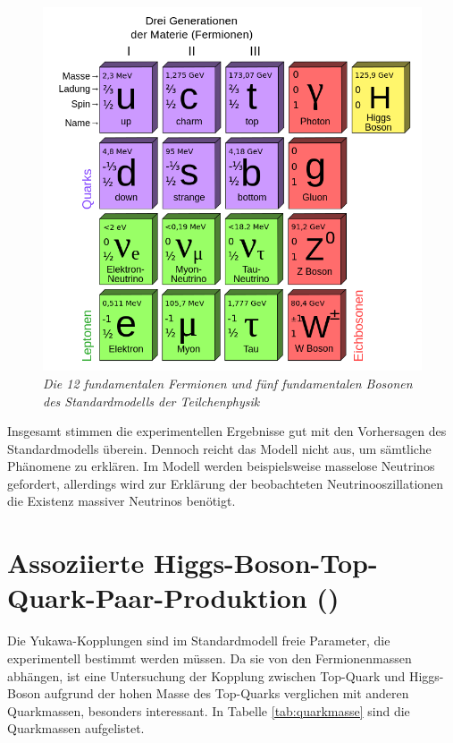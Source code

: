 \begin{figure}[hhh]
 \begin{center}
   \includegraphics[width=\textwidth]{graphics/Standard_Model.png}
   \parbox[b]{12cm}{
     \caption[Standardmodell der Teilchenphysik]
             {\label{fig:Standardmodell} \it\!Die 12 fundamentalen Fermionen und f\"unf fundamentalen Bosonen des Standardmodells der Teilchenphysik \cite{wiki:Standardmodell}}
   }
 \end{center}
\end{figure}

Insgesamt stimmen die experimentellen Ergebnisse gut mit den Vorhersagen des Standardmodells \"uberein. Dennoch reicht das Modell nicht aus, um s\"amtliche Ph\"anomene zu erkl\"aren. Im Modell werden beispielsweise masselose Neutrinos gefordert, allerdings wird zur Erkl\"arung der beobachteten Neutrinooszillationen die Existenz massiver Neutrinos ben\"otigt.

\section{Assoziierte Higgs-Boson-Top-Quark-Paar-Produktion (\ttH)}
\label{ch:Theorie:sec:ttH}

Die Yukawa-Kopplungen sind im Standardmodell freie Parameter, die experimentell bestimmt werden m\"ussen. Da sie von den Fermionenmassen abh\"angen, ist eine Untersuchung der Kopplung zwischen Top-Quark und Higgs-Boson aufgrund der hohen Masse des Top-Quarks verglichen mit anderen Quarkmassen, besonders interessant. In Tabelle \ref{tab:quarkmasse} sind die Quarkmassen aufgelistet.\\


